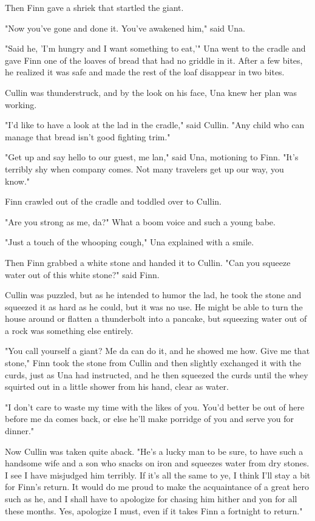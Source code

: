 Then Finn gave a shriek that startled the giant.

"Now you've gone and done it. You've awakened him," said Una.

"Said he, 'I'm hungry and I want something to eat,'" Una went to the cradle and gave Finn one of the loaves of bread that had no griddle in it. After a few bites, he realized it was safe and made the rest of the loaf disappear in two bites.

Cullin was thunderstruck, and by the look on his face, Una knew her plan was working.

"I'd like to have a look at the lad in the cradle," said Cullin. "Any child who can manage that bread isn't good fighting trim."

"Get up and say hello to our guest, me lan," said Una, motioning to Finn. "It's terribly shy when company comes. Not many travelers get up our way, you know."

Finn crawled out of the cradle and toddled over to Cullin.

"Are you strong as me, da?" What a boom voice and such a young babe.

"Just a touch of the whooping cough," Una explained with a smile.

Then Finn grabbed a white stone and handed it to Cullin. "Can you squeeze water out of this white stone?" said Finn.

Cullin was puzzled, but as he intended to humor the lad, he took the stone and squeezed it as hard as he could, but it was no use. He might be able to turn the house around or flatten a thunderbolt into a pancake, but squeezing water out of a rock was something else entirely.

"You call yourself a giant? Me da can do it, and he showed me how. Give me that stone," Finn took the stone from Cullin and then slightly exchanged it with the curds, just as Una had instructed, and he then squeezed the curds until the whey squirted out in a little shower from his hand, clear as water.

"I don't care to waste my time with the likes of you. You'd better be out of here before me da comes back, or else he'll make porridge of you and serve you for dinner."

Now Cullin was taken quite aback. "He's a lucky man to be sure, to have such a handsome wife and a son who snacks on iron and squeezes water from dry stones. I see I have misjudged him terribly. If it's all the same to ye, I think I'll stay a bit for Finn's return. It would do me proud to make the acquaintance of a great hero such as he, and I shall have to apologize for chasing him hither and yon for all these months. Yes, apologize I must, even if it takes Finn a fortnight to return."

